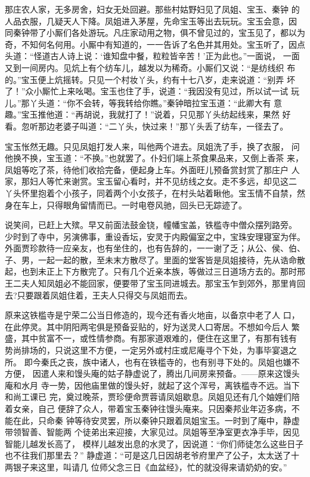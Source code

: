 那庄农人家，无多房舍，妇女无处回避。那些村姑野妇见了凤姐、宝玉、秦钟
的人品衣服，几疑天人下降。凤姐进入茅屋，先命宝玉等出去玩玩。宝玉会意，因
同秦钟带了小厮们各处游玩。凡庄家动用之物，俱不曾见过的，宝玉见了，都以为
奇，不知何名何用。小厮中有知道的，一一告诉了名色并其用处。宝玉听了，因点
头道：“怪道古人诗上说：‘谁知盘中餐，粒粒皆辛苦！’正为此也。”一面说，
一面又到一间房内。见炕上有个纺车儿，越发以为稀奇。小厮们又说：“是纺线织
布的。”宝玉便上炕摇转。只见一个村妆丫头，约有十七八岁，走来说道：“别弄
坏了！”众小厮忙上来吆喝。宝玉也住了手，说道：“我因没有见过，所以试一试
玩儿。”那丫头道：“你不会转，等我转给你瞧。”秦钟暗拉宝玉道：“此卿大有
意趣。”宝玉推他道：“再胡说，我就打了！”说着，只见那丫头纺起线来，果然
好看。忽听那边老婆子叫道：“二丫头，快过来！”那丫头丢了纺车，一径去了。

宝玉怅然无趣。只见凤姐打发人来，叫他两个进去。凤姐洗了手，换了衣服，
问他换不换，宝玉道：“不换。”也就罢了。仆妇们端上茶食果品来，又倒上香茶
来，凤姐等吃了茶，待他们收拾完备，便起身上车。外面旺儿预备赏封赏了那庄户
人家，那妇人等忙来谢赏。宝玉留心看时，并不见纺线之女。走不多远，却见这二
丫头怀里抱着个小孩子，同着两个小女孩子，在村头站着瞅他。宝玉情不自禁，然
身在车上，只得眼角留情而已。一时电卷风驰，回头已无踪迹了。

说笑间，已赶上大殡。早又前面法鼓金铙，幢幡宝盖，铁槛寺中僧众摆列路旁。
少时到了寺中，另演佛事，重设香坛，安灵于内殿偏室之中，宝珠安理寝室为伴。
外面贾珍款待一应亲友，也有坐住的，也有告辞的，一一谢了乏；从公、侯、伯、
子、男，一起一起的散，至未末方散尽了。里面的堂客皆是凤姐接待，先从诰命散
起，也到未正上下方散完了。只有几个近亲本族，等做过三日道场方去的。那时邢
王二夫人知凤姐必不能回家，便要带了宝玉同进城去。那宝玉乍到郊外，那里肯回
去?只要跟着凤姐住着，王夫人只得交与凤姐而去。

原来这铁槛寺是宁荣二公当日修造的，现今还有香火地亩，以备京中老了人
口，在此停灵。其中阴阳两宅俱是预备妥贴的，好为送灵人口寄居。不想如今后人
繁盛，其中贫富不一，或性情参商。有那家道艰难的，便住在这里了，有那有钱有
势尚排场的，只说这里不方便，一定另外或村庄或尼庵寻个下处，为事毕宴退之所。
即今秦氏之丧，族中诸人，也有在铁槛寺的，也有别寻下处的。凤姐也嫌不方便，
因遣人来和馒头庵的姑子静虚说了，腾出几间房来预备。——原来这馒头庵和水月
寺一势，因他庙里做的馒头好，就起了这个浑号，离铁槛寺不远。当下和尚工课已
完，奠过晚茶，贾珍便命贾蓉请凤姐歇息。凤姐见还有几个妯娌们陪着女亲，自己
便辞了众人，带着宝玉秦钟往馒头庵来。只因秦邦业年迈多病，不能在此，只命秦
钟等待安灵罢，所以秦钟只跟着凤姐宝玉。一时到了庵中，静虚带领智善、智能两
个徒弟出来迎接，大家见过。凤姐等至净室更衣净手毕，因见智能儿越发长高了，
模样儿越发出息的水灵了，因说道：“你们师徒怎么这些日子也不往我们那里去？”
静虚道：“可是这几日因胡老爷府里产了公子，太太送了十两银子来这里，叫请几
位师父念三日《血盆经》，忙的就没得来请奶奶的安。”

